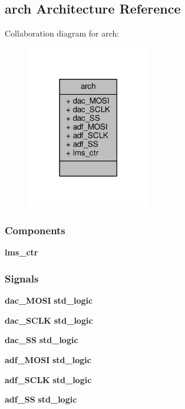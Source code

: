 \subsection{arch Architecture Reference}
\label{classnios__cpu_1_1arch}


Collaboration diagram for arch\+:\nopagebreak
\begin{figure}[H]
\begin{center}
\leavevmode
\includegraphics[width=153pt]{d8/dbf/classnios__cpu_1_1arch__coll__graph}
\end{center}
\end{figure}
\subsubsection*{Components}
 \begin{DoxyCompactItemize}
\item 
{\bf lms\+\_\+ctr}  {\bfseries }  
\end{DoxyCompactItemize}
\subsubsection*{Signals}
 \begin{DoxyCompactItemize}
\item 
{\bf dac\+\_\+\+M\+O\+SI} {\bfseries \textcolor{comment}{std\+\_\+logic}\textcolor{vhdlchar}{ }} 
\item 
{\bf dac\+\_\+\+S\+C\+LK} {\bfseries \textcolor{comment}{std\+\_\+logic}\textcolor{vhdlchar}{ }} 
\item 
{\bf dac\+\_\+\+SS} {\bfseries \textcolor{comment}{std\+\_\+logic}\textcolor{vhdlchar}{ }} 
\item 
{\bf adf\+\_\+\+M\+O\+SI} {\bfseries \textcolor{comment}{std\+\_\+logic}\textcolor{vhdlchar}{ }} 
\item 
{\bf adf\+\_\+\+S\+C\+LK} {\bfseries \textcolor{comment}{std\+\_\+logic}\textcolor{vhdlchar}{ }} 
\item 
{\bf adf\+\_\+\+SS} {\bfseries \textcolor{comment}{std\+\_\+logic}\textcolor{vhdlchar}{ }} 
\end{DoxyCompactItemize}

